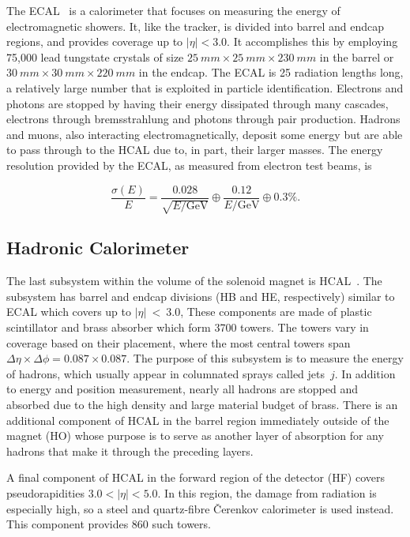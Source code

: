The ECAL~\cite{ecaltdr} is a calorimeter that focuses on measuring the energy of electromagnetic showers.
It, like the tracker, is divided into barrel and endcap regions, and provides coverage up to
$|\eta| < 3.0$.
It accomplishes this by employing 75,000 lead tungstate crystals of size
$25~mm \times 25~mm \times 230~mm$ in the barrel or $30~mm \times 30~mm \times 220~mm$ in the endcap.
The ECAL is 25 radiation lengths long, a relatively large number that is exploited in
particle identification. Electrons and photons are stopped by having their energy dissipated
through many cascades, electrons through bremsstrahlung and photons through pair production.
Hadrons and muons, also interacting electromagnetically, deposit some energy
but are able to pass through to the HCAL due to, in part, their larger masses. The energy resolution
provided by the ECAL, as measured from electron test beams, is

\begin{equation}
\frac{\sigma(E)}{E} = \frac{0.028}{\sqrt{E/\textrm{GeV}}} \oplus \frac{0.12}{E/\textrm{GeV}} \oplus 0.3\% .
\end{equation}

\subsection{Hadronic Calorimeter\label{subsec:hcal}}

The last subsystem within the volume of the solenoid magnet is HCAL~\cite{hcaltdr}.
The subsystem has barrel and endcap divisions (HB and HE, respectively) similar to ECAL which
covers up to $|\eta|~<~3.0$,
These components are made of plastic scintillator and brass absorber which form 3700 towers. The
towers vary in coverage based on their placement, where the most central towers span
$\Delta\eta \times \Delta\phi = 0.087 \times 0.087$. The purpose of this subsystem is to
measure the energy of hadrons, which usually appear in columnated sprays called jets~$j$. In addition
to energy and position measurement, nearly all hadrons are stopped and absorbed due to the
high density and large material budget of brass. There is an additional component of HCAL
in the barrel region immediately outside of the magnet (HO) whose purpose is to serve as another
layer of absorption for any hadrons that make it through the preceding layers.

A final component of HCAL in the forward region of the detector (HF)
covers pseudorapidities $3.0 < |\eta|< 5.0$. In this region, the damage from
radiation is especially high, so a steel and quartz-fibre \v{C}erenkov calorimeter is used instead.
This component provides 860 such towers.

